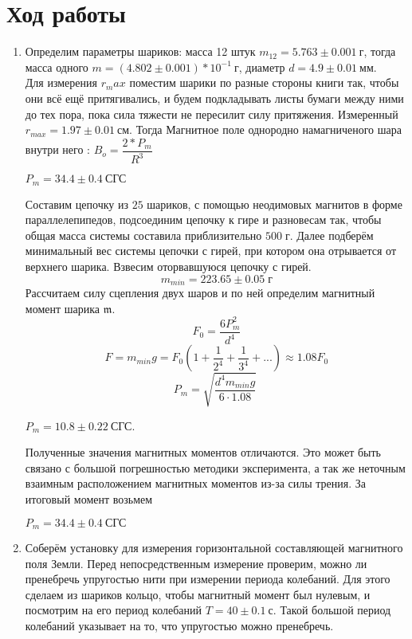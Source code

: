 \documentclass[a4paper,12pt]{article}
\begin{document}
\section*{Ход работы}
\begin{enumerate}
\item Определим параметры шариков: масса 12 штук $m_{12} = 5.763\pm 0.001~\text{г}$, тогда масса одного $m = (4.802 \pm 0.001)*10^{-1}~\text{г}$, диаметр $d = 4.9 \pm 0.01~\text{мм}$.\\
Для измерения $r_max$ поместим шарики по разные стороны книги так, чтобы они всё ещё притягивались, и будем подкладывать листы бумаги между ними до тех пора, пока сила тяжести не пересилит силу притяжения. Измеренный $r_{max} = 1.97 \pm 0.01~\text{см}$. Тогда 
Магнитное поле однородно намагниченого шара внутри него : $B_o = \dfrac{2*P_m}{R^3}$
\begin{center}
$P_m = 34.4 \pm 0.4 ~\text{СГС}$
\end{center}



Составим цепочку из $25$ шариков, с помощью неодимовых магнитов в форме параллелепипедов, подсоединим цепочку к гире и разновесам так, чтобы общая масса системы составила приблизительно $500 \;г$. Далее подберём минимальный вес системы цепочки с гирей, при котором она отрывается от верхнего шарика.
Взвесим оторвавшуюся цепочку с гирей. $$m_{min} = 223.65 \pm 0.05 \; г$$
Рассчитаем силу сцепления двух шаров и по ней определим магнитный момент шарика $\mathfrak{m}$. 
\[ F_0 = \frac{6P_m^2}{d^4} \] \[F = m_{min}g  = F_0(1+\frac1{2^4}+\frac1{3^4} +...)\approx 1.08 F_0 \]
\[ P_m = \sqrt{\frac{d^4m_{min}g}{6 \cdot 1.08}} \;\]

$P_m = 10.8 \pm 0.22 ~\text{СГС}$.

Полученные значения магнитных моментов отличаются. Это может быть связано с большой погрешностью методики эксперимента, а так же неточным взаимным расположением магнитных моментов из-за силы трения. 
За итоговый момент возьмем  \begin{center}
	$P_m = 34.4 \pm 0.4 ~\text{СГС}$
	\end{center}
	
\item Соберём установку для измерения горизонтальной составляющей магнитного поля Земли. Перед непосредственным измерение проверим, можно ли пренебречь упругостью нити при измерении периода колебаний. Для этого сделаем из шариков кольцо, чтобы магнитный момент был нулевым, и посмотрим на его период колебаний $T = 40 \pm 0.1~\text{с}$. Такой большой период колебаний указывает на то, что упругостью можно пренебречь.\\


\end{enumerate}
\end{document}
